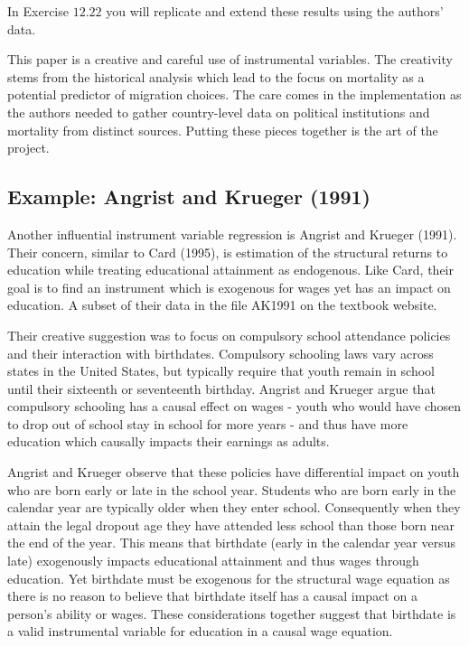 \documentclass[10pt]{article}
\begin{document}
In Exercise $12.22$ you will replicate and extend these results using the authors' data.

This paper is a creative and careful use of instrumental variables. The creativity stems from the historical analysis which lead to the focus on mortality as a potential predictor of migration choices. The care comes in the implementation as the authors needed to gather country-level data on political institutions and mortality from distinct sources. Putting these pieces together is the art of the project.

\subsection{Example: Angrist and Krueger (1991)}
Another influential instrument variable regression is Angrist and Krueger (1991). Their concern, similar to Card (1995), is estimation of the structural returns to education while treating educational attainment as endogenous. Like Card, their goal is to find an instrument which is exogenous for wages yet has an impact on education. A subset of their data in the file AK1991 on the textbook website.

Their creative suggestion was to focus on compulsory school attendance policies and their interaction with birthdates. Compulsory schooling laws vary across states in the United States, but typically require that youth remain in school until their sixteenth or seventeenth birthday. Angrist and Krueger argue that compulsory schooling has a causal effect on wages - youth who would have chosen to drop out of school stay in school for more years - and thus have more education which causally impacts their earnings as adults.

Angrist and Krueger observe that these policies have differential impact on youth who are born early or late in the school year. Students who are born early in the calendar year are typically older when they enter school. Consequently when they attain the legal dropout age they have attended less school than those born near the end of the year. This means that birthdate (early in the calendar year versus late) exogenously impacts educational attainment and thus wages through education. Yet birthdate must be exogenous for the structural wage equation as there is no reason to believe that birthdate itself has a causal impact on a person's ability or wages. These considerations together suggest that birthdate is a valid instrumental variable for education in a causal wage equation.
\end{document}
